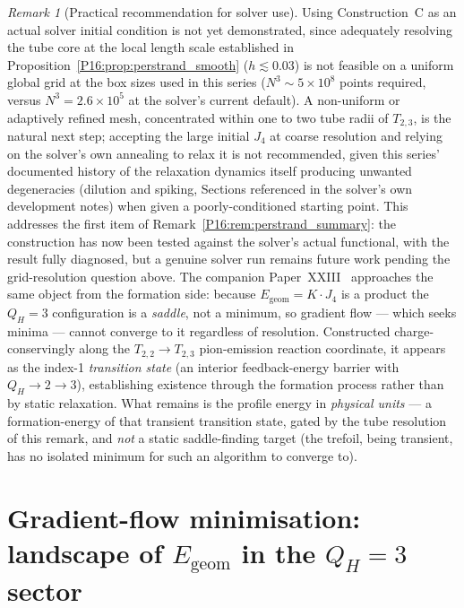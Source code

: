 \documentclass[11pt,a4paper]{article}
\theoremstyle{definition}\newtheorem{definition}[theorem]{Definition}
\theoremstyle{remark}
\newtheorem{remark}[theorem]{Remark}
\theoremstyle{definition}\newtheorem{construction}[theorem]{Construction}
\newcommand{\QH}{Q_H}
\begin{document}
\begin{remark}[Practical recommendation for solver use]
\label{P16:rem:solver_practical_recommendation}
Using Construction~C as an actual solver initial
condition is not yet demonstrated, since adequately resolving the tube
core at the local length scale established in
Proposition~\ref{P16:prop:perstrand_smooth} ($h\lesssim0.03$) is not
feasible on a uniform global grid at the box sizes used in this series
($N^3\sim5\times10^8$ points required, versus $N^3=2.6\times10^5$ at
the solver's current default). A non-uniform or adaptively refined
mesh, concentrated within one to two tube radii of $T_{2,3}$, is the
natural next step; accepting the large initial $J_4$ at coarse
resolution and relying on the solver's own annealing to relax it is
not recommended, given this series' documented history of the
relaxation dynamics itself producing unwanted degeneracies (dilution
and spiking, Sections referenced in the solver's own development
notes) when given a poorly-conditioned starting point. This addresses
the first item of Remark~\ref{P16:rem:perstrand_summary}: the construction
has now been tested against the solver's actual functional, with the
result fully diagnosed, but a genuine solver run remains future work
pending the grid-resolution question above.
The companion Paper~XXIII~\cite{Paper23} approaches the same object from the
formation side: because $E_{\mathrm{geom}}=K\!\cdot\!J_4$ is a product the
$\QH=3$ configuration is a \emph{saddle}, not a minimum, so gradient flow ---
which seeks minima --- cannot converge to it regardless of resolution.
Constructed charge-conservingly along the $T_{2,2}\!\to\!T_{2,3}$ pion-emission
reaction coordinate, it appears as the index-1 \emph{transition state} (an
interior feedback-energy barrier with $\QH\!\to\!2\!\to\!3$), establishing
existence through the formation process rather than by static relaxation. What
remains is the profile energy in \emph{physical units} --- a formation-energy of
that transient transition state, gated by the tube resolution of this remark, and
\emph{not} a static saddle-finding target (the trefoil, being transient, has no
isolated minimum for such an algorithm to converge to).
\end{remark}

\section{Gradient-flow minimisation: landscape of $E_{\mathrm{geom}}$ in
  the $\QH=3$ sector}
\label{P16:sec:gradient_flow}
\end{document}
